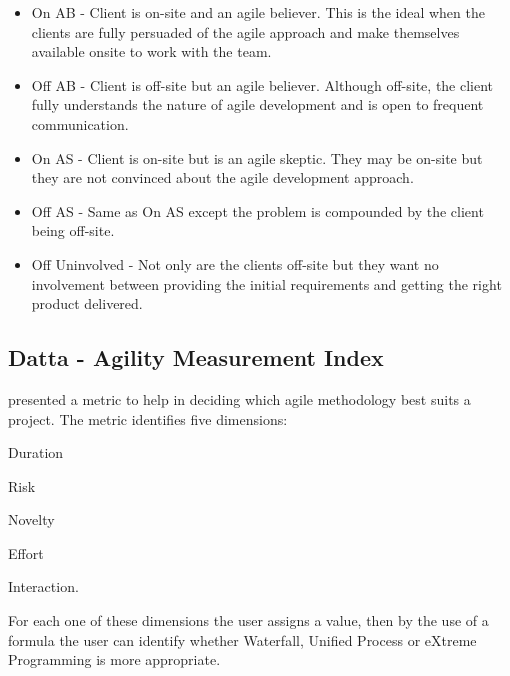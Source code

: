 \begin{itemize}
\item On AB - Client is on-site and an agile believer. This is the ideal when the clients are fully persuaded of the agile approach and make themselves available onsite to work with the team.
\item Off AB - Client is off-site but an agile believer. Although off-site, the client fully understands the nature of agile development and is open to frequent communication.
\item On AS - Client is on-site but is an agile skeptic. They may be on-site but they are not convinced about the agile development approach.
\item Off AS - Same as On AS except the problem is compounded by the client being off-site.
\item Off Uninvolved - Not only are the clients off-site but they want no involvement between providing the initial requirements and getting the right product delivered.
\end{itemize}

\subsection{Datta - Agility Measurement Index} %
\citet{datta_dissertation} presented a metric to help in deciding which agile methodology best suits a project. The metric identifies five dimensions: 
\begin{inparaenum} [a\upshape)]
\item Duration
\item Risk
\item Novelty
\item Effort
\item Interaction.
\end{inparaenum}
For each one of these dimensions the user assigns a value, then by the use of a formula the user can identify whether Waterfall, Unified Process or eXtreme Programming is more appropriate.

